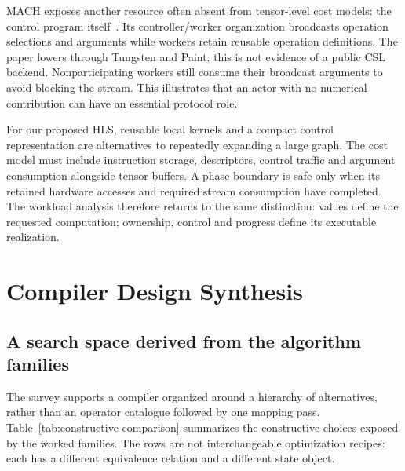 \documentclass[final,3p,times,authoryear]{elsarticle}
\begin{document}
MACH exposes another resource often absent from tensor-level cost models: the control program itself~\citep{vanessendelft2025}. Its controller/worker organization broadcasts operation selections and arguments while workers retain reusable operation definitions. The paper lowers through Tungsten and Paint; this is not evidence of a public CSL backend. Nonparticipating workers still consume their broadcast arguments to avoid blocking the stream. This illustrates that an actor with no numerical contribution can have an essential protocol role.

For our proposed HLS, reusable local kernels and a compact control representation are alternatives to repeatedly expanding a large graph. The cost model must include instruction storage, descriptors, control traffic and argument consumption alongside tensor buffers. A phase boundary is safe only when its retained hardware accesses and required stream consumption have completed. The workload analysis therefore returns to the same distinction: values define the requested computation; ownership, control and progress define its executable realization.


\section{Compiler Design Synthesis}\label{sec:design}
\subsection{A search space derived from the algorithm families}
The survey supports a compiler organized around a hierarchy of alternatives, rather than an operator catalogue followed by one mapping pass. Table~\ref{tab:constructive-comparison} summarizes the constructive choices exposed by the worked families. The rows are not interchangeable optimization recipes: each has a different equivalence relation and a different state object.
\end{document}
